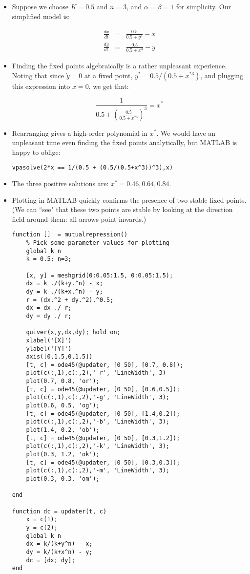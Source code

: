 \documentclass{article}
\begin{document}
\begin{itemize}
\item  Suppose we choose $K=0.5$ and $n=3$, and $\alpha=\beta=1$ for simplicity. Our simplified model is:

\begin{eqnarray*}
\frac{dx}{dt} & = & \frac{0.5}{0.5 + y^3} - x\\
\frac{dy}{dt} & = & \frac{0.5}{0.5 + x^3} - y
\end{eqnarray*}

\item Finding the fixed points algebraically is a rather unpleasant experience. Noting that since $\dot{y}=0$ at a fixed point, $y^* = 0.5/(0.5 + x^{*3})$, and plugging this expression into $\dot{x}=0$, we get that:

\[ \frac{1}{0.5 + \left( \frac{0.5}{0.5+ x^{*3}} \right)^3} = x^* \]

\item Rearranging gives a high-order polynomial in $x^*$. We would have an unpleasant time even finding the fixed points analytically, but MATLAB is happy to oblige:

\begin{lstlisting}
vpasolve(2*x == 1/(0.5 + (0.5/(0.5+x^3))^3),x)
\end{lstlisting}

\item The three positive solutions are: $x^* = 0.46, 0.64, 0.84$.

\item Plotting in MATLAB quickly confirms the presence of two stable fixed points. (We can ``see" that these two points are stable by looking at the direction field around them: all arrows point inwards.)

\begin{lstlisting}
function []  = mutualrepression()
    % Pick some parameter values for plotting
    global k n
    k = 0.5; n=3;
    
    [x, y] = meshgrid(0:0.05:1.5, 0:0.05:1.5);
    dx = k ./(k+y.^n) - x;
    dy = k ./(k+x.^n) - y;
    r = (dx.^2 + dy.^2).^0.5;
    dx = dx ./ r;
    dy = dy ./ r;
    
    quiver(x,y,dx,dy); hold on;
    xlabel('[X]')
    ylabel('[Y]')
    axis([0,1.5,0,1.5])
    [t, c] = ode45(@updater, [0 50], [0.7, 0.8]);
    plot(c(:,1),c(:,2),'-r', 'LineWidth', 3)
    plot(0.7, 0.8, 'or');
    [t, c] = ode45(@updater, [0 50], [0.6,0.5]);
    plot(c(:,1),c(:,2),'-g', 'LineWidth', 3);
    plot(0.6, 0.5, 'og');
    [t, c] = ode45(@updater, [0 50], [1.4,0.2]);
    plot(c(:,1),c(:,2),'-b', 'LineWidth', 3);
    plot(1.4, 0.2, 'ob');
    [t, c] = ode45(@updater, [0 50], [0.3,1.2]);
    plot(c(:,1),c(:,2),'-k', 'LineWidth', 3);
    plot(0.3, 1.2, 'ok');
    [t, c] = ode45(@updater, [0 50], [0.3,0.3]);
    plot(c(:,1),c(:,2),'-m', 'LineWidth', 3);
    plot(0.3, 0.3, 'om');
      
end

function dc = updater(t, c)
    x = c(1);
    y = c(2);
    global k n
    dx = k/(k+y^n) - x;
    dy = k/(k+x^n) - y;
    dc = [dx; dy];
end
\end{lstlisting}
\end{itemize}
\end{document}
